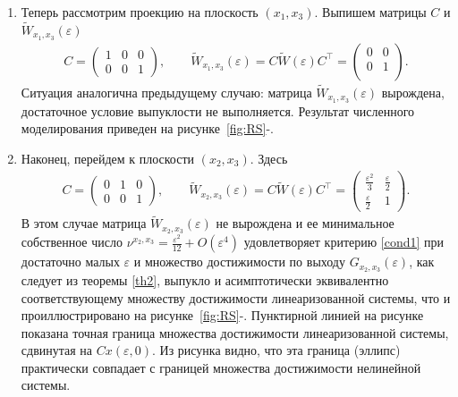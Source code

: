 \documentclass[../main.tex]{subfiles}
\begin{document}
\begin{enumerate}
		
		\item Теперь рассмотрим проекцию на плоскость $ (x_1, x_3) $. Выпишем матрицы $ C $ и $ \widetilde{W}_{x_1,x_3}(\varepsilon) $
		\begin{gather*}
			C = \begin{pmatrix}
				1 & 0 & 0 \\
				0 & 0 & 1
			\end{pmatrix}, \qquad
			\widetilde{W}_{x_1,x_3}(\varepsilon) =  C \widetilde{W} (\varepsilon) C^{\top}  =\begin{pmatrix}
				0 & 0 \\
				0 & 1 \\
			\end{pmatrix} .
		\end{gather*}
		Ситуация аналогична предыдущему случаю: матрица $ \widetilde{W}_{x_1,x_3}(\varepsilon)  $ вырождена, достаточное условие выпуклости не выполняется. Результат численного моделирования приведен на рисунке~\ref{fig:RS}-.
		\item Наконец, перейдем к плоскости $ (x_2, x_3) $. Здесь
		\begin{gather*}
			C = \begin{pmatrix}
				0 & 1 & 0 \\
				0 & 0 & 1
			\end{pmatrix}, \qquad \widetilde{W}_{x_2,x_3}(\varepsilon) =  C \widetilde{W} (\varepsilon) C^{\top}  =\begin{pmatrix}
				\frac{\varepsilon^2}{3} & \frac{\varepsilon}{2} \\
				\frac{\varepsilon}{2} & 1
			\end{pmatrix}.
		\end{gather*}
		В этом случае матрица $ \widetilde{W}_{x_2,x_3}(\varepsilon) $ не вырождена и ее минимальное собственное число $ \nu^{x_2,x_3} = \frac{\varepsilon^2}{12} + O(\varepsilon^4)  $ удовлетворяет критерию \eqref{cond1} при достаточно малых $ \varepsilon $ и множество достижимости по выходу $ G_{x_2,x_3}(\varepsilon) $, как следует из теоремы \ref{th2}, выпукло и асимптотически эквивалентно соответствующему множеству достижимости линеаризованной системы, что и проиллюстрировано на рисунке~\ref{fig:RS}-. Пунктирной линией на рисунке показана точная граница множества достижимости линеаризованной системы, сдвинутая на $ Cx(\varepsilon, 0) $. Из рисунка видно, что эта граница (эллипс) практически совпадает с границей множества достижимости нелинейной системы.
	\end{enumerate} 
	
\end{document}
